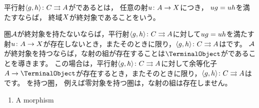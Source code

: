 \begin{definition}
    平行射\(\ParallelFunctionStyle{%
        \OrderedTuple<\Morphism<g>, \Morphism<h>>
    }{%
        \Object<C>
    }{%
        \Object<A>
    }\)が\WordCodisjointed であるとは，
    任意の射\(\FunctionStyle{\Morphism<u>}{\Object<A>}{\Object<X>}\)につき，
    \(\Morphism<ug>=\Morphism<uh>\)を満たすならば，
    終域\(\Object<X>\)が終対象であることをいう。
\end{definition}

圏\(\ZariskiCategory\)が終対象を持たないならば，平行射\(\ParallelFunctionStyle{%
    \OrderedTuple<\Morphism<g>, \Morphism<h>>
}{%
    \Object<C>
}{%
    \Object<A>
}\)に対して\(\Morphism<ug>=\Morphism<uh>\)を満たす射\(\FunctionStyle{\Morphism<u>}{\Object<A>}{\Object<X>}\)が存在しないとき，またそのときに限り，\(\ParallelFunctionStyle{%
    \OrderedTuple<\Morphism<g>, \Morphism<h>>
}{%
    \Object<C>
}{%
    \Object<A>
}\)は\WordCodisjointed です。
\(\ZariskiCategory\)が終対象を持つならば，\WordCodisjointed な射の組が存在することは\(\TerminalObject\)が\WordStrictTerminalObject であることを導きます。
この場合は，平行射\(\ParallelFunctionStyle{%
    \OrderedTuple<\Morphism<g>, \Morphism<h>>
}{%
    \Object<C>
}{%
    \Object<A>
}\)に対して余等化子\(\Object<A>\to\TerminalObject\)が存在するとき，またそのときに限り，\(\ParallelFunctionStyle{%
    \OrderedTuple<\Morphism<g>, \Morphism<h>>
}{%
    \Object<C>
}{%
    \Object<A>
}\)は\WordCodisjointed です。
\WordNonStrictTerminalObject を持つ圏，
例えば零対象を持つ圏は，\WordCodisjointed な射の組は存在しません。

\begin{definition}
    \begin{enumerate}
        \item A morphism
    \end{enumerate}
\end{definition}